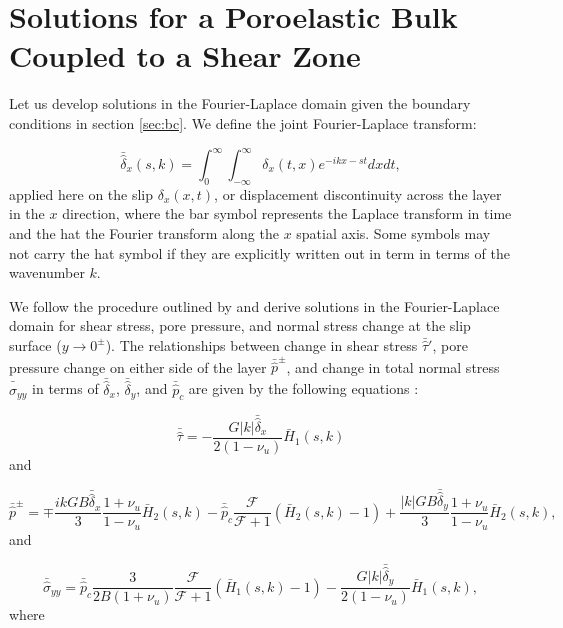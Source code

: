 \documentclass[draft]{agujournal2019}
\begin{document}
\section{Solutions for a Poroelastic Bulk Coupled to a Shear Zone} \label{sec:porosol}


Let us develop solutions in the Fourier-Laplace domain given the boundary conditions in section \ref{sec:bc}. We define the joint Fourier-Laplace transform: 

\begin{equation}
\bar{\hat{\delta}}_x(s,k) = \int_{0}^{\infty} \int_{-\infty}^{\infty} \delta_x(t,x)
e^{-ikx-st} dx dt ,
\label{eq:LF}
\end{equation}
applied here on the slip $\delta_x(x,t)$, or displacement discontinuity across the layer in the $x$ direction, where the bar symbol represents the Laplace transform in time and the hat the Fourier transform along the $x$ spatial axis. Some symbols may not carry the hat symbol if they are explicitly written out in term in terms of the wavenumber $k$.
	
We follow the procedure outlined by  and derive solutions in the Fourier-Laplace domain for shear stress, pore pressure, and normal stress change at the slip surface ($y \rightarrow 0^\pm$). The relationships between change in shear stress $\bar{\hat{\tau}}'$, pore pressure change on either side of the layer $\bar{\hat{p}}^\pm$, and change in total normal stress $\bar{\hat{\sigma}}_{yy}$ in terms of $\bar{\hat{\delta}}_x$, $\bar{\hat{\delta}}_y$, and $\bar{\hat{p}}_c$ are given by the following equations \cite{Heimisson2021}:
	
\begin{equation}
\bar{\hat{\tau}} = -  \frac{G |k| \bar{\hat{\delta}}_x}{2(1-\nu_u)} \bar{H}_1(s,k)
\label{eq:tau}
\end{equation}
and

\begin{equation}
\bar{\hat{p}}^\pm = \mp \frac{ik G B \bar{\hat{\delta}}_x}{3} \frac{1+\nu_u}{1-\nu_u} \bar{H}_2(s,k) -  \bar{\hat{p}}_c \frac{\mathcal{F}}{\mathcal{F} + 1} \left( \bar{H}_2(s,k) - 1 \right) + \frac{|k| G B \bar{\hat{\delta}}_y}{3} \frac{1+\nu_u}{1-\nu_u} \bar{H}_2(s,k) ,
\label{eq:p}
\end{equation}
and

\begin{equation}
\bar{\hat{\sigma}}_{yy} = \bar{\hat{p}}_c \frac{3 }{2 B (1 + \nu_u)} \frac{ \mathcal{F} }{\mathcal{F} + 1} (\bar{H}_1(s,k) - 1) - \frac{G |k| \bar{\hat{\delta}}_y}{2(1-\nu_u)} \bar{H}_1(s,k),
\label{eq:sigyy}
\end{equation}
where
\end{document}

